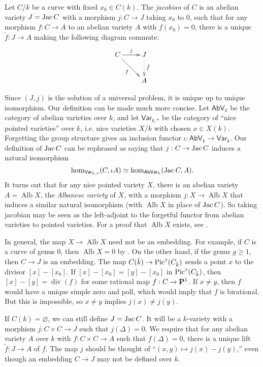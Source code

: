 \begin{definition}[Albanese]
Let $C/k$ be a curve with fixed $x_0\in C(k)$. The \emph{jacobian} of $C$ is 
an abelian variety $J=\operatorname{Jac} C$ with a morphism $j:C\to J$ taking $x_0$ to $0$, such 
that for any morphism $f:C\to A$ to an abelian variety $A$ with $f(x_0)=0$, 
there is a unique $\tilde f:J\to A$ making the following diagram commute:
\[\xymatrix{
  C \ar[r]^-j \ar[dr]_-f 
    & J \ar@{.>}[d]^-{\tilde f} \\
  & A
}\]
\end{definition}

Since $(J,j)$ is the solution of a universal problem, it is unique up to 
unique isomorphism. Our definition can be made much more concise. Let 
$\mathsf{AbV}_k$ be the category of abelian varieties over $k$, and let 
$\mathsf{Var}_{k,\ast}$ be the category of ``nice pointed varieties'' over $k$, 
i.e. nice varieties $X/k$ with chosen $x\in X(k)$. Forgetting the group 
structure gives an inclusion functor 
$\iota:\mathsf{AbV}_k\to \mathsf{Var}_k$. Our definition of $\operatorname{Jac} C$ can be 
rephrased as saying that $j:C\to \operatorname{Jac} C$ induces a natural isomorphism 
\[
  \hom_{\mathsf{Var}_{k,\ast}}(C,\iota A) \simeq \hom_{\mathsf{AbVar}_k}(\operatorname{Jac} C,A)\text{.}
\]
It turns out that for any nice pointed variety $X$, there is an abelian variety 
$A=\operatorname{Alb} X$, the \emph{Albanese variety} of $X$, with a morphism 
$j:X\to \operatorname{Alb} X$ that induces a similar natural isomorphism (with 
$\operatorname{Alb} X$ in place of $\operatorname{Jac} C$). So taking jacobian may be seen 
as the left-adjoint to the forgetful functor from abelian varieties to pointed 
varieties. For a proof that $\operatorname{Alb} X$ exists, see 
\cite[A.11]{mo12}.

In general, the map $X\to \operatorname{Alb} X$ need not be an embedding. 
For example, if $C$ is a curve of genus $0$, then $\operatorname{Alb} X=0$ by 
\cite[I.3.9]{mi-av}. On the other hand, if the genus $g\geqslant 1$, then 
$C\to J$ is an embedding. The map $C(\bar k)\to \operatorname{Pic}^\circ(C_{\bar k})$ sends 
a point $x$ to the divisor $[x]-[x_0]$. If $[x]-[x_0] = [y]-[x_0]$ in 
$\operatorname{Pic}^\circ(C_{\bar k})$, then $[x]-[y] = \operatorname{div}(f)$ for some 
rational map $f:C\to \mathbf{P}^1$. If $x\ne y$, then $f$ would have a unique simple 
zero and poll, which would imply that $f$ is birational. But this is 
impossible, so $x\ne y$ implies $j(x)\ne j(y)$. 

If $C(k)=\varnothing$, we can still define $J=\operatorname{Jac} C$. It will be a $k$-variety 
with a morphism $j:C\times C\to J$ such that $j(\Delta)=0$. We require 
that for any abelian variety $A$ over $k$ with $f:C\times C\to A$ such that 
$f(\Delta)=0$, there is a unique lift $\tilde f:J\to A$ of $f$. The map $j$ 
should be thought of ``$(x,y)\mapsto j(x)-j(y)$,'' even though an embedding 
$C\to J$ may not be defined over $k$. 





